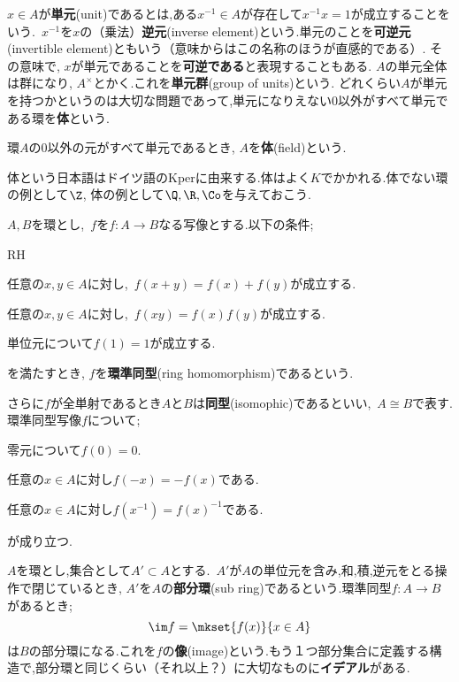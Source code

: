 $x\in A$が\textbf{単元}(unit)であるとは,ある$x^{-1}\in A$が存在して$x^{-1}x=1$が成立することをいう.~$x^{-1}$を$x$の（乗法）\textbf{逆元}(inverse element)という.単元のことを\textbf{可逆元}(invertible element)ともいう（意味からはこの名称のほうが直感的である）. その意味で, $x$が単元であることを\textbf{可逆である}と表現することもある. $A$の単元全体は群になり, $A^\times$とかく.これを\textbf{単元群}(group of units)という. どれくらい$A$が単元を持つかというのは大切な問題であって,単元になりえない$0$以外がすべて単元である環を\textbf{体}という.

\begin{defi}[体]
	環$A$の0以外の元がすべて単元であるとき, $A$を\textbf{体}(field)という.
\end{defi}

体という日本語はドイツ語のKperに由来する.体はよく$K$でかかれる.体でない環の例として$\Z$, 体の例として$\Q,\R,\Co$を与えておこう.

\begin{defi}[環準同型]
	$A,B$を環とし,~$f$を$f:A\to B$なる写像とする.以下の条件;
	\begin{defiterm}{RH}
		\item 任意の$x,y\in A$に対し,~$f(x+y)=f(x)+f(y)$が成立する.
		\item 任意の$x,y\in A$に対し,~$f(xy)=f(x)f(y)$が成立する.
		\item 単位元について$f(1)=1$が成立する.
	\end{defiterm}
	
	を満たすとき, $f$を\textbf{環準同型}(ring homomorphism)であるという.
\end{defi}

さらに$f$が全単射であるとき$A$と$B$は\textbf{同型}(isomophic)であるといい,~$A\cong B$で表す. 環準同型写像$f$について;

\begin{sakura}
	\item 零元について$f(0)=0$.
	\item 任意の$x\in A$に対し$f(-x)=-f(x)$である.
	\item 任意の$x\in A$に対し$f(x^{-1})=f(x)^{-1}$である.
\end{sakura}
が成り立つ.

$A$を環とし,集合として$A'\subset A$とする.~$A'$が$A$の単位元を含み,和,積,逆元をとる操作で閉じているとき, $A'$を$A$の\textbf{部分環}(sub ring)であるという.環準同型$f:A\to B$があるとき;
\[\im f=\mkset{f(x)}{x\in A}\]
は$B$の部分環になる.これを$f$の\textbf{像}(image)という.もう１つ部分集合に定義する構造で,部分環と同じくらい（それ以上？）に大切なものに\textbf{イデアル}がある.

